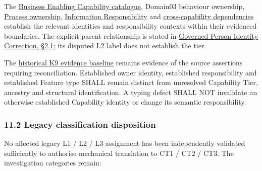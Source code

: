 The \hyperref[rad:enabling]{Business Enabling Capability catalogue}, Domain03 behaviour ownership, \hyperref[rad:processes]{Process ownership}, \href{https://github.com/fhirfactory/harmonia/blob/98410db60155198a75f74c79d98060070209faa1/docs/markdown/03-business-architecture/information-responsibility/information-responsibility.md}{Information Responsibility} and \hyperref[rad:dependencies]{cross-capability dependencies} establish the relevant identities and responsibility contexts within their evidenced boundaries. The explicit \texttt{} parent relationship is stated in \hyperref[rad:processes:69]{Governed Person Identity Correction, §2.1}; its disputed L2 label does not establish the tier.

\label{rad:k9:1413}

The \href{https://github.com/fhirfactory/harmonia/blob/98410db60155198a75f74c79d98060070209faa1/.junie/reports/2026-10-07-domain04-package2-evidence-baseline.md\#k9--capability-metamodel-typing}{historical K9 evidence baseline} remains evidence of the source assertions requiring reconciliation. Established owner identity, established responsibility and established Feature type SHALL remain distinct from unresolved Capability Tier, ancestry and structural identification. A typing defect SHALL NOT invalidate an otherwise established Capability identity or change its semantic responsibility.

\label{rad:k9:1415}
\subsubsection*{11.2 Legacy classification disposition}
\label{rad:k9:1417}

No affected legacy L1 /\allowbreak{} L2 /\allowbreak{} L3 assignment has been independently validated sufficiently to authorise mechanical translation to CT1 /\allowbreak{} CT2 /\allowbreak{} CT3. The investigation categories remain:

